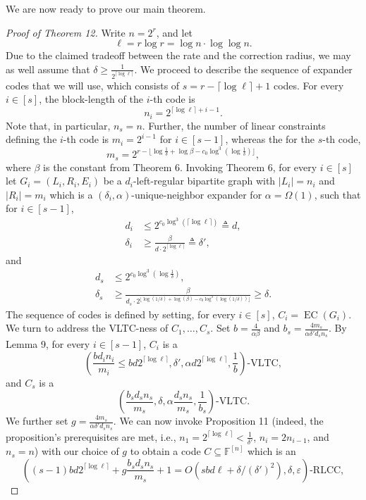 We are now ready to prove our main theorem.
\begin{proof}[Proof of Theorem 12]
Write $n=2^r$, and let
\[\ell=r\log r=\log n\cdot\log\log n.\]
Due to the claimed tradeoff between the rate and the correction radius, we may as well assume that $\delta\ge\frac1{2^{\lceil\log\ell\rceil}}$. We proceed to describe the sequence of expander codes that we will use, which consists of $s=r-\lceil\log\ell\rceil+1$ codes. For every $i\in[s]$, the block-length of the $i$-th code is
\[n_i=2^{\lceil\log\ell\rceil+i-1}.\]
Note that, in particular, $n_s=n$. Further, the number of linear constraints defining the $i$-th code is $m_i=2^{i-1}$ for $i\in[s-1]$, whereas the for the $s$-th code,
\[m_s=2^{r-\lfloor\log\frac1\delta+\log\beta-c_0\log^3(\log\frac1\delta)\rfloor},\]
where $\beta$ is the constant from Theorem 6.
Invoking Theorem 6, for every $i\in[s]$ let $G_i=(L_i,R_i,E_i)$ be a $d_i$-left-regular bipartite graph with $|L_i|=n_i$ and $|R_i|=m_i$ which is a $(\delta_i,\alpha)$-unique-neighbor expander for $\alpha=\Omega(1)$, such that for $i\in[s-1]$,
\begin{align*}d_i&\le2^{c_0\log^3(\lceil\log\ell\rceil)}\triangleq d,\\\delta_i&\ge\frac\beta{d\cdot2^{\lceil\log\ell\rceil}}\triangleq\delta',\end{align*}
and
\begin{align*}d_s&\le2^{c_0\log^3(\log\frac1\delta)},\\\delta_s&\ge\frac\beta{d_s\cdot2^{\lfloor\log(1/\delta)+\log(\beta)-c_0\log^3(\log(1/\delta))\rfloor}}\ge\delta.\end{align*}
The sequence of codes is defined by setting, for every $i\in[s]$, $C_i=\operatorname{EC}(G_i)$.
We turn to address the VLTC-ness of $C_1,\ldots,C_s$. Set $b=\frac4{\alpha\beta}$ and $b_s=\frac{4m_s}{\alpha\delta'd_s n_s}$. By Lemma 9, for every $i\in[s-1]$, $C_i$ is a
\[\left(\frac{bd_i n_i}{m_i}\le bd2^{\lceil\log\ell\rceil},\delta',\alpha d2^{\lceil\log\ell\rceil},\frac1b\right)\text{-VLTC},\]
and $C_s$ is a
\[\left(\frac{b_s d_s n_s}{m_s},\delta,\alpha\frac{d_s n_s}{m_s},\frac1{b_s}\right)\text{-VLTC}.\]
We further set $g=\frac{4m_s}{\alpha\delta'd_s n_s}$. We can now invoke Proposition 11 (indeed, the proposition's prerequisites are met, i.e., $n_1=2^{\lceil\log\ell\rceil}<\frac1{\delta'}$, $n_i=2n_{i-1}$, and $n_s=n$) with our choice of $g$ to obtain a code $C\subseteq\mathbb F^{[n]}$ which is an
\[\left((s-1)bd2^{\lceil\log\ell\rceil}+g\frac{b_s d_s n_s}{m_s}+1=O(sbd\ell+\delta/(\delta')^2),\delta,\varepsilon\right)\text{-RLCC},\]

\end{proof}
